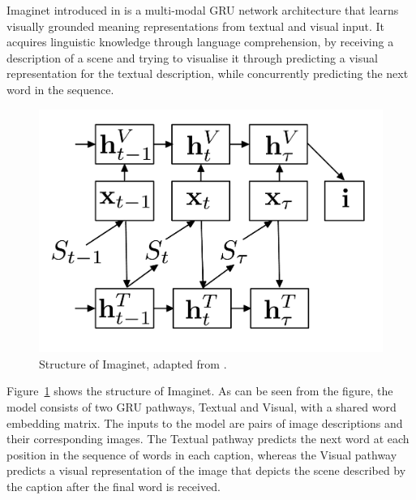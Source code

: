 {\sc Imaginet} introduced in  is a
multi-modal GRU network architecture that learns visually grounded
meaning representations from textual and visual input.  It acquires 
linguistic knowledge through language comprehension, by receiving a
description of a scene and trying to visualise it through predicting a visual
representation for the textual description, while concurrently predicting 
the next word in the sequence. 

\begin{figure}
\begin{center}
\includegraphics[scale=0.2]{imaginet.pdf} 
\caption{Structure of {\sc Imaginet}, adapted from \protect\cite{chrupala2015learning}.}
\label{fig:imaginet}
\end{center}
\end{figure}

Figure~\ref{fig:imaginet} shows the structure of {\sc Imaginet}. As can
be seen from the figure, the model consists of two GRU pathways, 
{\sc Textual} and {\sc Visual}, with a shared word embedding matrix. 
The inputs to the model are pairs of image descriptions and their 
corresponding images. The {\sc Textual} pathway predicts the next 
word at each position in the sequence of words in each caption, whereas the 
{\sc Visual} pathway predicts a visual representation of the image that depicts the 
scene described by the caption after the final word is received.


